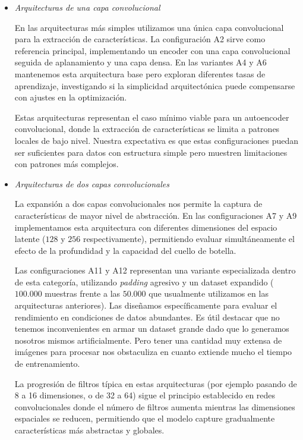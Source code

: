\hspace{0.5cm}

\begin{itemize}
    \item \emph{Arquitecturas de una capa convolucional}

    En las arquitecturas más simples utilizamos una única capa convolucional para la extracción de características. La configuración A2 sirve como referencia principal, implementando un encoder con una capa convolucional seguida de aplanamiento y una capa densa. En las variantes A4 y A6 mantenemos esta arquitectura base pero exploran diferentes tasas de aprendizaje, investigando si la simplicidad arquitectónica puede compensarse con ajustes en la optimización.
    
    Estas arquitecturas representan el caso mínimo viable para un autoencoder convolucional, donde la extracción de características se limita a patrones locales de bajo nivel. Nuestra expectativa es que estas configuraciones puedan ser suficientes para datos con estructura simple pero muestren limitaciones con patrones más complejos.
    
    \item \emph{Arquitecturas de dos capas convolucionales}
    
    La expansión a dos capas convolucionales nos permite la captura de características de mayor nivel de abstracción. En las configuraciones A7 y A9 implementamos esta arquitectura con diferentes dimensiones del espacio latente ($128$ y $256$ respectivamente), permitiendo evaluar simultáneamente el efecto de la profundidad y la capacidad del cuello de botella.
    
    Las configuraciones A11 y A12 representan una variante especializada dentro de esta categoría, utilizando \emph{padding} agresivo y un dataset expandido ($100.000$ muestras frente a las $50.000$ que usualmente utilizamos en las arquitecturas anteriores). Las diseñamos específicamente para evaluar el rendimiento en condiciones de datos abundantes. Es útil destacar que no tenemos inconvenientes en armar un dataset grande dado que lo generamos nosotros mismos artificialmente. Pero tener una cantidad muy extensa de imágenes para procesar nos obstaculiza en cuanto extiende mucho el tiempo de entrenamiento.
    
    La progresión de filtros típica en estas arquitecturas (por ejemplo pasando de 8 a 16 dimensiones, o de 32 a 64) sigue el principio establecido en redes convolucionales donde el número de filtros aumenta mientras las dimensiones espaciales se reducen, permitiendo que el modelo capture gradualmente características más abstractas y globales.
    

\end{itemize}
